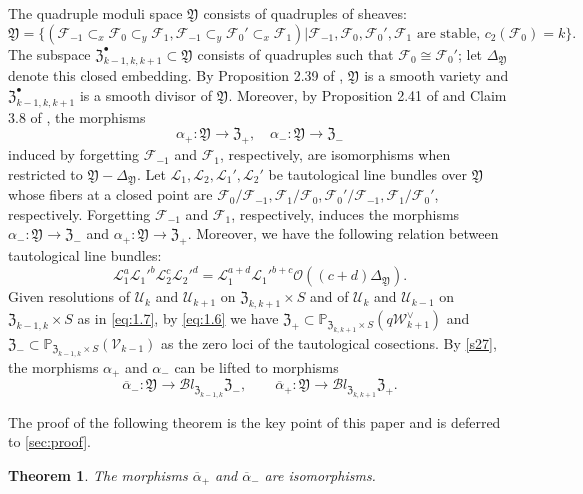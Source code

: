 \documentclass{amsart}
\numberwithin{equation}{section}
\newcommand\mc{\mathcal}
\newcommand\mf{\mathfrak}
\newcommand\mb{\mathbb}
\newtheorem{theorem}{Theorem}[section]
\theoremstyle{definition}
\theoremstyle{remark}
\begin{document}
The quadruple moduli space $\mf{Y}$ consists of quadruples of sheaves:
\begin{equation*}
   \mf{Y}=\{(\mc{F}_{-1}\subset_{x}\mc{F}_{0}\subset_{y} \mc{F}_{1}, \mc{F}_{-1}\subset_{y}\mc{F}_{0}'\subset_{x} \mc{F}_{1})|\mc{F}_{-1},\mc{F}_{0},\mc{F}_{0}',\mc{F}_{1} \text{ are stable, } c_{2}(\mc{F}_{0})=k\}.
\end{equation*}
The subspace $\mf{Z}_{k-1,k,k+1}^{\bullet}\subset\mf{Y}$ consists of quadruples such that $\mc{F}_{0}\cong \mc{F}_{0}'$; let $\Delta_{\mf{Y}}$ denote this closed embedding.
By Proposition 2.39 of \cite{neguct2018hecke}, $\mf{Y}$ is a smooth variety and $\mf{Z}_{k-1,k,k+1}^{\bullet}$ is a smooth divisor of $\mf{Y}$. Moreover, by Proposition 2.41 of \cite{neguct2018hecke} and Claim 3.8 of \cite{negut2017shuffle}, the morphisms
\begin{equation*}
  \alpha_{+}:\mf{Y}\to \mf{Z}_{+}, \quad \alpha_{-}:\mf{Y}\to \mf{Z}_{-}
\end{equation*}
induced by forgetting $\mc{F}_{-1}$ and $\mc{F}_{1}$, respectively, are isomorphisms when restricted to $\mf{Y}-\Delta_{\mf{Y}}$. Let $\mathcal{L}_{1},\mathcal{L}_{2},\mathcal{L}_{1}',\mathcal{L}_2'$ be tautological line bundles over $\mf{Y}$ whose fibers at a closed point are $\mc{F}_{0}/\mc{F}_{-1},\mc{F}_{1}/\mc{F}_{0},\mc{F}_{0}'/\mc{F}_{-1},\mc{F}_{1}/\mc{F}_{0}'$, respectively. Forgetting $\mc{F}_{-1}$ and $\mc{F}_{1}$, respectively, induces the morphisms $\alpha_{-}:\mf{Y}\to \mf{Z}_{-}$ and $\alpha_{+}:\mf{Y}\to \mf{Z}_{+}$. Moreover, we have the following relation between tautological line bundles:
    \begin{equation}
      \label{neq35}
    \mc{L}_{1}^{a}\mc{L}_{1}'^{b}\mc{L}_{2}^{c}\mc{L}_{2}'^{d}=\mc{L}_{1}^{a+d}\mc{L}_{1}'^{b+c}\mc{O}((c+d)\Delta_{\mf{Y}}).
    \end{equation}
Given resolutions of $\mc{U}_{k}$ and $\mc{U}_{k+1}$ on $\mf{Z}_{k,k+1}\times S$ and of $\mc{U}_{k}$ and $\mc{U}_{k-1}$ on $\mf{Z}_{k-1,k}\times S$ as in \cref{eq:1.7}, by \cref{eq:1.6} we have $\mf{Z}_{+}\subset \mb{P}_{\mf{Z}_{k,k+1}\times S}(q\mc{W}_{k+1}^{\vee})$ and $\mf{Z}_{-}\subset \mb{P}_{\mf{Z}_{k-1,k}\times S}(\mc{V}_{k-1})$ as the zero loci of the tautological cosections. By \cref{s27}, the morphisms $\alpha_{+}$ and $\alpha_{-}$ can be lifted to morphisms
   $$\overline{\alpha}_{-}:\mf{Y}\to \mc{B}l_{\mf{Z}_{k-1,k}}\mf{Z}_{-}, \qquad\overline{\alpha}_{+}:\mf{Y}\to \mc{B}l_{\mf{Z}_{k,k+1}}\mf{Z}_{+}.$$

The proof of the following theorem is the key point of this paper and is deferred to \cref{sec:proof}.  
\begin{theorem}
  \label{p36}
  The morphisms $\overline{\alpha}_{+}$ and $\overline{\alpha}_{-}$ are isomorphisms.
\end{theorem}
\end{document}
